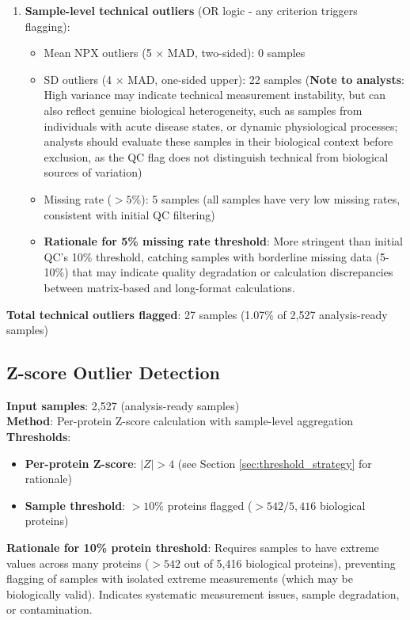\documentclass[11pt,a4paper]{article}
\begin{document}
\begin{enumerate}
\item \textbf{Sample-level technical outliers} (OR logic - any criterion triggers flagging):
   \begin{itemize}
     \item Mean NPX outliers (5 $\times$ MAD, two-sided): 0 samples
     \item SD outliers (4 $\times$ MAD, one-sided upper): 22 samples (\textbf{Note to analysts}: High variance may indicate technical measurement instability, but can also reflect genuine biological heterogeneity, such as samples from individuals with acute disease states, or dynamic physiological processes; analysts should evaluate these samples in their biological context before exclusion, as the QC flag does not distinguish technical from biological sources of variation)
     \item Missing rate ($>5\%$): 5 samples (all samples have very low missing rates, consistent with initial QC filtering)
     \item \textbf{Rationale for 5\% missing rate threshold}: More stringent than initial QC's 10\% threshold, catching samples with borderline missing data (5-10\%) that may indicate quality degradation or calculation discrepancies between matrix-based and long-format calculations.
   \end{itemize}
\end{enumerate}

\textbf{Total technical outliers flagged}: 27 samples (1.07\% of 2,527 analysis-ready samples)

\subsection{Z-score Outlier Detection}
\textbf{Input samples}: 2,527 (analysis-ready samples)\\

\textbf{Method}: Per-protein Z-score calculation with sample-level aggregation\\

\textbf{Thresholds}:

\begin{itemize}
\item \textbf{Per-protein Z-score}: $|Z| > 4$ (see Section \ref{sec:threshold_strategy} for rationale)
\item \textbf{Sample threshold}: $>10\%$ proteins flagged ($>542/5,416$ biological proteins)
\end{itemize}

\textbf{Rationale for 10\% protein threshold}: Requires samples to have extreme values across many proteins ($>542$ out of 5,416 biological proteins), preventing flagging of samples with isolated extreme measurements (which may be biologically valid). Indicates systematic measurement issues, sample degradation, or contamination.
\end{document}
